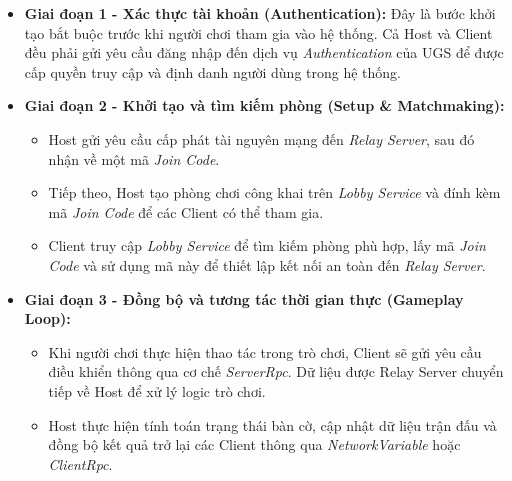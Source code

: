 \begin{itemize}
    \item \textbf{Giai đoạn 1 - Xác thực tài khoản (Authentication):} Đây là bước khởi tạo bắt buộc trước khi người chơi tham gia vào hệ thống. Cả Host và Client đều phải gửi yêu cầu đăng nhập đến dịch vụ \textit{Authentication} của UGS để được cấp quyền truy cập và định danh người dùng trong hệ thống.

    \item \textbf{Giai đoạn 2 - Khởi tạo và tìm kiếm phòng (Setup \& Matchmaking):}
    \begin{itemize}
        \item Host gửi yêu cầu cấp phát tài nguyên mạng đến \textit{Relay Server}, sau đó nhận về một mã \textit{Join Code}.
        
        \item Tiếp theo, Host tạo phòng chơi công khai trên \textit{Lobby Service} và đính kèm mã \textit{Join Code} để các Client có thể tham gia.
        
        \item Client truy cập \textit{Lobby Service} để tìm kiếm phòng phù hợp, lấy mã \textit{Join Code} và sử dụng mã này để thiết lập kết nối an toàn đến \textit{Relay Server}.
    \end{itemize}

    \item \textbf{Giai đoạn 3 - Đồng bộ và tương tác thời gian thực (Gameplay Loop):}
    \begin{itemize}
        \item Khi người chơi thực hiện thao tác trong trò chơi, Client sẽ gửi yêu cầu điều khiển thông qua cơ chế \textit{ServerRpc}. Dữ liệu được Relay Server chuyển tiếp về Host để xử lý logic trò chơi.
        
        \item Host thực hiện tính toán trạng thái bàn cờ, cập nhật dữ liệu trận đấu và đồng bộ kết quả trở lại các Client thông qua \textit{NetworkVariable} hoặc \textit{ClientRpc}.
    \end{itemize}
\end{itemize}



\newpage